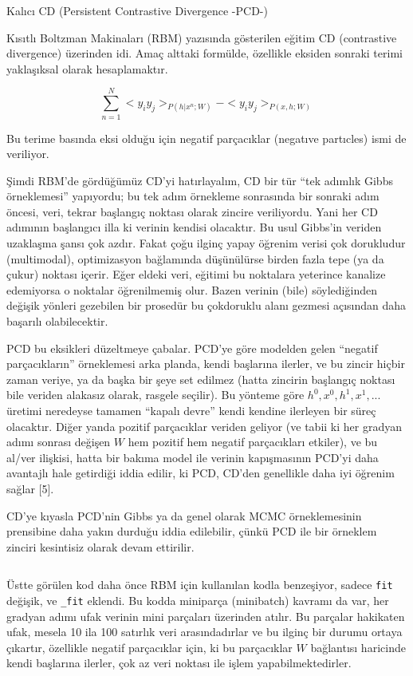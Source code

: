 \documentclass[12pt,fleqn]{article}\usepackage{../../common}
\begin{document}
Kalıcı CD (Persistent Contrastive Divergence -PCD-)

Kısıtlı Boltzman Makinaları (RBM) yazısında gösterilen eğitim CD
(contrastive divergence) üzerinden idi. Amaç alttaki formülde, özellikle
eksiden sonraki terimi yaklaşıksal olarak hesaplamaktır. 

$$ 
\sum_{n=1}^{N}  < y_iy_j >_{P(h|x^n;W)} - < y_iy_j >_{P(x,h;W)} 
$$

Bu terime basında eksi olduğu için negatif parçacıklar (negatıve partıcles)
ismi de veriliyor. 

Şimdi RBM'de gördüğümüz CD'yi hatırlayalım, CD bir tür ``tek adımlık Gibbs
örneklemesi'' yapıyordu; bu tek adım örnekleme sonrasında bir sonraki adım
öncesi, veri, tekrar başlangıç noktası olarak zincire veriliyordu. Yani her CD
adımının başlangıcı illa ki verinin kendisi olacaktır. Bu usul Gibbs'in veriden
uzaklaşma şansı çok azdır. Fakat çoğu ilginç yapay öğrenim verisi çok dorukludur
(multimodal), optimizasyon bağlamında düşünülürse birden fazla tepe (ya da
çukur) noktası içerir. Eğer eldeki veri, eğitimi bu noktalara yeterince kanalize
edemiyorsa o noktalar öğrenilmemiş olur. Bazen verinin (bile) söylediğinden
değişik yönleri gezebilen bir prosedür bu çokdoruklu alanı gezmesi açısından
daha başarılı olabilecektir.

PCD bu eksikleri düzeltmeye çabalar. PCD'ye göre modelden gelen ``negatif
parçacıkların'' örneklemesi arka planda, kendi başlarına ilerler, ve bu
zincir hiçbir zaman veriye, ya da başka bir şeye set edilmez (hatta
zincirin başlangıç noktası bile veriden alakasız olarak, rasgele
seçilir). Bu yönteme göre $h^0,x^0, h^1, x^1, ...$ üretimi neredeyse
tamamen ``kapalı devre'' kendi kendine ilerleyen bir süreç olacaktır. Diğer
yanda pozitif parçacıklar veriden geliyor (ve tabii ki her gradyan adımı
sonrası değişen $W$ hem pozitif hem negatif parçacıkları etkiler), ve bu
al/ver ilişkisi, hatta bir bakıma model ile verinin kapışmasının PCD'yi
daha avantajlı hale getirdiği iddia edilir, ki PCD, CD'den genellikle daha
iyi öğrenim sağlar [5].

CD'ye kıyasla PCD'nin Gibbs ya da genel olarak MCMC örneklemesinin
prensibine daha yakın durduğu iddia edilebilir, çünkü PCD ile bir örneklem
zinciri kesintisiz olarak devam ettirilir. 

\inputminted[fontsize=\footnotesize]{python}{rbmp.py}

Üstte görülen kod daha önce RBM için kullanılan kodla benzeşiyor, sadece
\verb!fit! değişik, ve \verb!_fit! eklendi. Bu kodda miniparça (minibatch)
kavramı da var, her gradyan adımı ufak verinin mini parçaları üzerinden
atılır. Bu parçalar hakikaten ufak, mesela 10 ila 100 satırlık veri
arasındadırlar ve bu ilginç bir durumu ortaya çıkartır, özellikle negatif
parçacıklar için, ki bu parçacıklar $W$ bağlantısı haricinde kendi başlarına
ilerler, çok az veri noktası ile işlem yapabilmektedirler.
\end{document}
